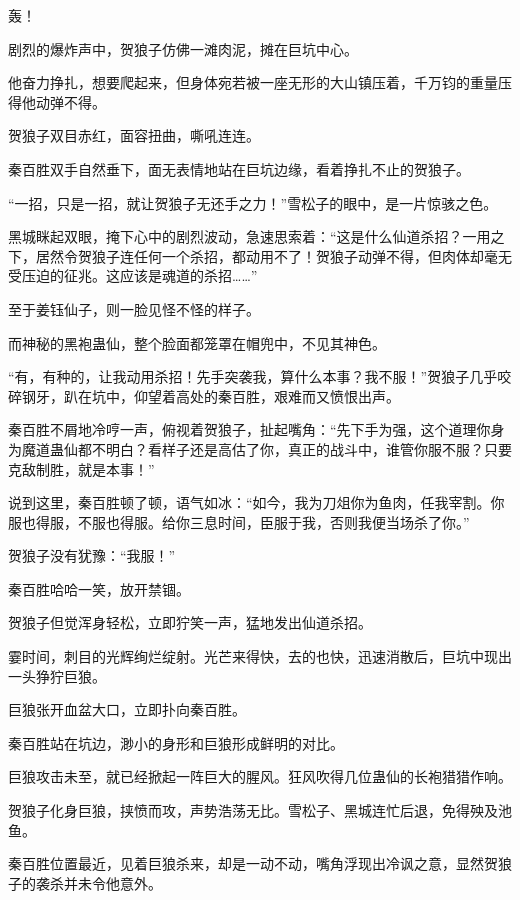 
\begin{this_body}



轰！

剧烈的爆炸声中，贺狼子仿佛一滩肉泥，摊在巨坑中心。

他奋力挣扎，想要爬起来，但身体宛若被一座无形的大山镇压着，千万钧的重量压得他动弹不得。

贺狼子双目赤红，面容扭曲，嘶吼连连。

秦百胜双手自然垂下，面无表情地站在巨坑边缘，看着挣扎不止的贺狼子。

“一招，只是一招，就让贺狼子无还手之力！”雪松子的眼中，是一片惊骇之色。

黑城眯起双眼，掩下心中的剧烈波动，急速思索着：“这是什么仙道杀招？一用之下，居然令贺狼子连任何一个杀招，都动用不了！贺狼子动弹不得，但肉体却毫无受压迫的征兆。这应该是魂道的杀招……”

至于姜钰仙子，则一脸见怪不怪的样子。

而神秘的黑袍蛊仙，整个脸面都笼罩在帽兜中，不见其神色。

“有，有种的，让我动用杀招！先手突袭我，算什么本事？我不服！”贺狼子几乎咬碎钢牙，趴在坑中，仰望着高处的秦百胜，艰难而又愤恨出声。

秦百胜不屑地冷哼一声，俯视着贺狼子，扯起嘴角：“先下手为强，这个道理你身为魔道蛊仙都不明白？看样子还是高估了你，真正的战斗中，谁管你服不服？只要克敌制胜，就是本事！”

说到这里，秦百胜顿了顿，语气如冰：“如今，我为刀俎你为鱼肉，任我宰割。你服也得服，不服也得服。给你三息时间，臣服于我，否则我便当场杀了你。”

贺狼子没有犹豫：“我服！”

秦百胜哈哈一笑，放开禁锢。

贺狼子但觉浑身轻松，立即狞笑一声，猛地发出仙道杀招。

霎时间，刺目的光辉绚烂绽射。光芒来得快，去的也快，迅速消散后，巨坑中现出一头狰狞巨狼。

巨狼张开血盆大口，立即扑向秦百胜。

秦百胜站在坑边，渺小的身形和巨狼形成鲜明的对比。

巨狼攻击未至，就已经掀起一阵巨大的腥风。狂风吹得几位蛊仙的长袍猎猎作响。

贺狼子化身巨狼，挟愤而攻，声势浩荡无比。雪松子、黑城连忙后退，免得殃及池鱼。

秦百胜位置最近，见着巨狼杀来，却是一动不动，嘴角浮现出冷讽之意，显然贺狼子的袭杀并未令他意外。


\end{this_body}
